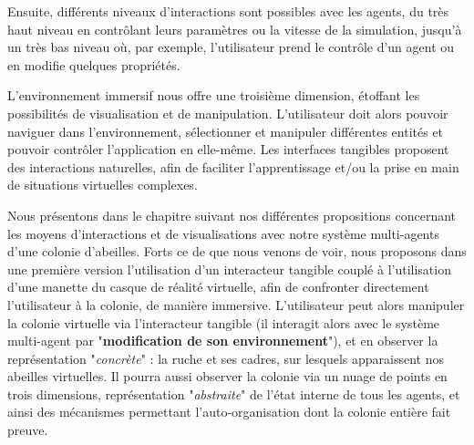 		Ensuite, différents niveaux d'interactions sont possibles avec les agents, du très haut niveau en contrôlant leurs paramètres ou la vitesse de la simulation, jusqu'à un très bas niveau où, par exemple, l'utilisateur prend le contrôle d'un agent ou en modifie quelques propriétés.
		
		L'environnement immersif nous offre une troisième dimension, étoffant les possibilités de visualisation et de manipulation. L'utilisateur doit alors pouvoir naviguer dans l'environnement, sélectionner et manipuler différentes entités et pouvoir contrôler l'application en elle-même. Les interfaces tangibles proposent des interactions naturelles, afin de faciliter l'apprentissage et/ou la prise en main de situations virtuelles complexes.
		
		Nous présentons dans le chapitre suivant nos différentes propositions concernant les moyens d'interactions et de visualisations avec notre système multi-agents d'une colonie d'abeilles. Forts ce de que nous venons de voir, nous proposons dans une première version l'utilisation d'un interacteur tangible couplé à l'utilisation d'une manette du casque de réalité virtuelle, afin de confronter directement l'utilisateur à la colonie, de manière immersive.	
		L'utilisateur peut alors manipuler la colonie virtuelle via l'interacteur tangible (il interagit alors avec le système multi-agent par "\textbf{modification de son environnement}"), et en observer la représentation "\textit{concrète}" : la ruche et ses cadres, sur lesquels apparaissent nos abeilles virtuelles.
		Il pourra aussi observer la colonie via un nuage de points en trois dimensions, représentation "\textit{abstraite}" de l'état interne de tous les agents, et ainsi des mécanismes permettant l'auto-organisation dont la colonie entière fait preuve.